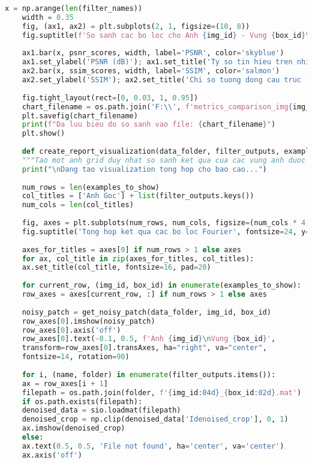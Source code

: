 \documentclass[12pt, a4paper]{article}
\begin{document}
\begin{lstlisting}[language=Python, caption={Mã nguồn tạo báo cáo tùy chọn và biểu đồ.}, label={lst:create_report}]
	x = np.arange(len(filter_names))
	width = 0.35
	fig, (ax1, ax2) = plt.subplots(2, 1, figsize=(10, 8))
	fig.suptitle(f'So sanh cac bo loc cho Anh {img_id} - Vung {box_id}\n(So voi anh goc bi nhieu)', fontsize=16)
	
	ax1.bar(x, psnr_scores, width, label='PSNR', color='skyblue')
	ax1.set_ylabel('PSNR (dB)'); ax1.set_title('Ty so tin hieu tren nhieu dinh (PSNR)'); ax1.set_xticks(x); ax1.set_xticklabels(filter_names); ax1.legend()
	ax2.bar(x, ssim_scores, width, label='SSIM', color='salmon')
	ax2.set_ylabel('SSIM'); ax2.set_title('Chi so tuong dong cau truc (SSIM)'); ax2.set_xticks(x); ax2.set_xticklabels(filter_names); ax2.legend(); ax2.set_ylim(0, 1)
	
	fig.tight_layout(rect=[0, 0.03, 1, 0.95])
	chart_filename = os.path.join('F:\\', f'metrics_comparison_img{img_id}_box{box_id}.png')
	plt.savefig(chart_filename)
	print(f"Da luu bieu do so sanh vao file: {chart_filename}")
	plt.show()
	
	def create_report_visualization(data_folder, filter_outputs, examples_to_show, save_path):
	"""Tao mot anh grid duy nhat so sanh ket qua cua cac vung anh duoc chon."""
	print("\nDang tao visualization tong hop cho bao cao...")
	
	num_rows = len(examples_to_show)
	col_titles = ['Anh Goc'] + list(filter_outputs.keys())
	num_cols = len(col_titles)
	
	fig, axes = plt.subplots(num_rows, num_cols, figsize=(num_cols * 4, num_rows * 4))
	fig.suptitle('Tong hop ket qua cac bo loc Fourier', fontsize=24, y=1.0)
	
	axes_for_titles = axes[0] if num_rows > 1 else axes
	for ax, col_title in zip(axes_for_titles, col_titles):
	ax.set_title(col_title, fontsize=16, pad=20)
	
	for current_row, (img_id, box_id) in enumerate(examples_to_show):
	row_axes = axes[current_row, :] if num_rows > 1 else axes
	
	noisy_patch = get_noisy_patch(data_folder, img_id, box_id)
	row_axes[0].imshow(noisy_patch)
	row_axes[0].axis('off')
	row_axes[0].text(-0.1, 0.5, f'Anh {img_id}\nVung {box_id}', 
	transform=row_axes[0].transAxes, ha="right", va="center", 
	fontsize=14, rotation=90)
	
	for i, (name, folder) in enumerate(filter_outputs.items()):
	ax = row_axes[i + 1]
	filepath = os.path.join(folder, f'{img_id:04d}_{box_id:02d}.mat')
	if os.path.exists(filepath):
	denoised_data = sio.loadmat(filepath)
	denoised_crop = np.clip(denoised_data['Idenoised_crop'], 0, 1)
	ax.imshow(denoised_crop)
	else:
	ax.text(0.5, 0.5, 'File not found', ha='center', va='center')
	ax.axis('off')
	

\end{lstlisting}
\end{document}
